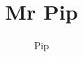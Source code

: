 \documentclass{article}%
\title{Mr Pip}%
\author{Pip}%
\begin{document}
%
\normalsize%
\maketitle%
\end{document}
